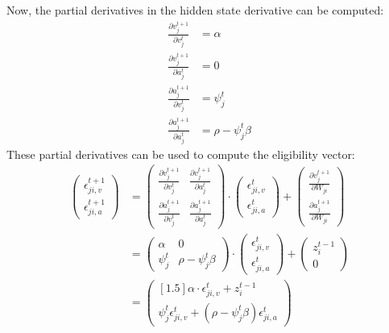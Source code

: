         Now, the partial derivatives in the hidden state derivative can be computed:
        \begin{align}
        \frac{\partial v_j^{t+1}}{\partial v_j^t} &= \alpha\\
        \frac{\partial v_j^{t+1}}{\partial a_j^t} &= 0\\
        \frac{\partial a_j^{t+1}}{\partial v_j^t} &= \psi^t_j\\
        \frac{\partial a_j^{t+1}}{\partial a_j^t} &= \rho - \psi^t_j\beta
        \end{align}
        These partial derivatives can be used to compute the eligibility vector:
        \begin{align}
        \begin{pmatrix}
        \epsilon_{ji, v}^{t+1}\\
        \epsilon_{ji, a}^{t+1}
        \end{pmatrix}
        &=
        \begin{pmatrix}
        \frac{\partial v^{t+1}_j}{\partial v^t_j} & \frac{\partial v^{t+1}_j}{\partial a^t_j}\\
        \frac{\partial a^{t+1}_j}{\partial v^t_j} & \frac{\partial a^{t+1}_j}{\partial a^t_j}
        \end{pmatrix}
        \cdot
        \begin{pmatrix}
        \epsilon_{ji, v}^t\\
        \epsilon_{ji, a}^t
        \end{pmatrix}
        +
        \begin{pmatrix}
        \frac{\partial v^{t+1}_j}{\partial W_{ji}}\\
        \frac{\partial a^{t+1}_j}{\partial W_{ji}}
        \end{pmatrix}\\
        &=
        \begin{pmatrix}
        \alpha & 0\\
        \psi^t_j & \rho-\psi^t_j\beta
        \end{pmatrix}
        \cdot
        \begin{pmatrix}
        \epsilon_{ji, v}^t\\
        \epsilon_{ji, a}^t
        \end{pmatrix}
        +
        \begin{pmatrix}
        z_i^{t-1}\\
        0
        \end{pmatrix}\label{eq:evector_b}\\
        &=
        \begin{pmatrix}[1.5]
        \alpha \cdot\epsilon_{ji, v}^t + z_i^{t-1}\\
        \psi^t_j\epsilon^t_{ji, v} + \left(\rho-\psi^t_j\beta\right)\epsilon^t_{ji, a}
        \end{pmatrix}
        \end{align}

